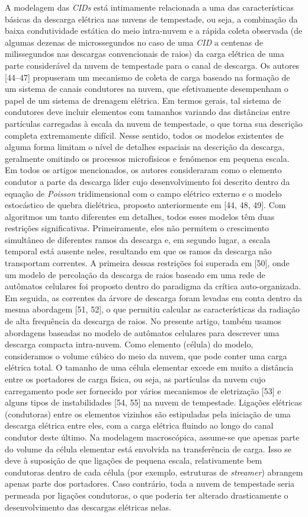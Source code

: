 \documentclass[a4paper, 12pt, onecolumn,singlespacing]{article}
\begin{document}
	A modelagem das \textit{CIDs} está intimamente relacionada a uma das características básicas da descarga elétrica nas nuvens de tempestade, ou seja, a combinação da baixa condutividade estática do meio intra-nuvem e a rápida coleta observada (de algumas dezenas de microssegundos no caso de uma \textit{CID} a centenas de milissegundos nas descargas convencionais de raios) da carga elétrica de uma parte considerável da nuvem de tempestade para o canal de descarga. Os autores [44–47] propuseram um mecanismo de coleta de carga baseado na formação de um sistema de canais condutores na nuvem, que efetivamente desempenham o papel de um sistema de drenagem elétrica. Em termos gerais, tal sistema de condutores deve incluir elementos com tamanhos variando das distâncias entre partículas carregadas à escala da nuvem de tempestade, o que torna sua descrição completa extremamente difícil. Nesse sentido, todos os modelos existentes de alguma forma limitam o nível de detalhes espaciais na descrição da descarga, geralmente omitindo os processos microfísicos e fenômenos em pequena escala. Em todos os artigos mencionados, os autores consideraram como o elemento condutor a parte da descarga líder cujo desenvolvimento foi descrito dentro da equação de \textit{Poisson} tridimensional com o campo elétrico externo e o modelo estocástico de quebra dielétrica, proposto anteriormente em [44, 48, 49]. Com algoritmos um tanto diferentes em detalhes, todos esses modelos têm duas restrições significativas. Primeiramente, eles não permitem o crescimento simultâneo de diferentes ramos da descarga e, em segundo lugar, a escala temporal está ausente neles, resultando em que os ramos da descarga não transportam correntes. A primeira dessas restrições foi superada em [50], onde um modelo de percolação da descarga de raios baseado em uma rede de autômatos celulares foi proposto dentro do paradigma da crítica auto-organizada. Em seguida, as correntes da árvore de descarga foram levadas em conta dentro da mesma abordagem [51, 52], o que permitiu calcular as características da radiação de alta frequência da descarga de raios. No presente artigo, também usamos abordagens baseadas no modelo de autômatos celulares para descrever uma descarga compacta intra-nuvem. Como elemento (célula) do modelo, consideramos o volume cúbico do meio da nuvem, que pode conter uma carga elétrica total. O tamanho de uma célula elementar excede em muito a distância entre os portadores de carga física, ou seja, as partículas da nuvem cujo carregamento pode ser fornecido por vários mecanismos de eletrização [53] e alguns tipos de instabilidades [54, 55] na nuvem de tempestade. Ligações elétricas (condutoras) entre os elementos vizinhos são estipuladas pela iniciação de uma descarga elétrica entre eles, com a carga elétrica fluindo ao longo do canal condutor deste último. Na modelagem macroscópica, assume-se que apenas parte do volume da célula elementar está envolvida na transferência de carga. Isso se deve à suposição de que ligações de pequena escala, relativamente bem condutoras dentro de cada célula (por exemplo, estruturas de \textit{streamer}) abrangem apenas parte dos portadores. Caso contrário, toda a nuvem de tempestade seria permeada por ligações condutoras, o que poderia ter alterado drasticamente o desenvolvimento das descargas elétricas nelas.
	
\end{document}
